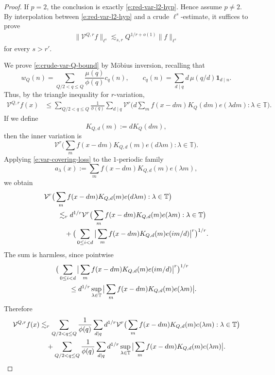 \documentclass[12pt]{amsart}
\numberwithin{equation}{section}
\theoremstyle{definition}
\begin{document}
\begin{proof}
If \(p=2\), the conclusion is exactly \eqref{e:red-var-l2-hyp}.  Hence assume
\(p\neq2\).  By interpolation between \eqref{e:red-var-l2-hyp} and a crude
\(\ell^s\)-estimate, it suffices to prove
\begin{align}\label{e:crude-var-Q-bound}
    \|\mathcal V^{Q,r}f\|_{\ell^s}
    \lesssim_{s,r}
    Q^{1/r+o(1)}\|f\|_{\ell^s}
\end{align}
for every \(s>r'\).

We prove \eqref{e:crude-var-Q-bound} by M\"obius inversion, recalling that
\[
    w_Q(n)
    =
    \sum_{Q/2<q\leq Q}
    \frac{\mu(q)}{\phi(q)}c_q(n),
    \qquad
    c_q(n)
    =
    \sum_{d\mid q} d\,\mu(q/d)\mathbf 1_{d\mid n}.
\]
Thus, by the triangle inequality for \(r\)-variation,
\begin{align}
    \mathcal V^{Q,r}f(x)
    &\leq
    \sum_{Q/2<q\leq Q}
    \frac1{\phi(q)}
    \sum_{d\mid q}
    \mathcal{V}^r\big(
    d\sum_m f(x-dm)K_Q(dm)e(\lambda dm):\lambda\in\mathbb T
    \big).
\end{align}
If we define
\[
    K_{Q,d}(m):=dK_Q(dm),
\]
then the inner variation is
\[
    \mathcal{V}^r\big(
    \sum_m f(x-dm)K_{Q,d}(m)e(d\lambda m):\lambda\in\mathbb T
    \big).
\]
Applying \eqref{e:var-covering-loss} to the \(1\)-periodic family
\[
    a_\lambda(x)
    :=
    \sum_m f(x-dm)K_{Q,d}(m)e(\lambda m),
\]
we obtain
\begin{align}
    &\mathcal{V}^r\big(
    \sum_m f(x-dm)K_{Q,d}(m)e(d\lambda m):\lambda\in\mathbb T
    \big)
    \notag\\
    &\qquad\lesssim_r
    d^{1/r}
    \mathcal{V}^r\big(
    \sum_m f(x-dm)K_{Q,d}(m)e(\lambda m):\lambda\in\mathbb T
    \big)
    \notag\\
    &\qquad\quad+
    \big(
    \sum_{0\leq i<d}
    \big|
    \sum_m f(x-dm)K_{Q,d}(m)e(im/d)
    \big|^r
    \big)^{1/r}.
\end{align}
The sum is harmless, since pointwise
\begin{align}
    &\big(
    \sum_{0\leq i<d}
    \big|
    \sum_m f(x-dm)K_{Q,d}(m)e(im/d)
    \big|^r
    \big)^{1/r}
    \notag\\
    &\qquad\leq
    d^{1/r}
    \sup_{\lambda\in\mathbb T}
    \big|
    \sum_m f(x-dm)K_{Q,d}(m)e(\lambda m)
    \big|.
\end{align}
Therefore
\begin{align}\label{e:mobius-var-pointwise}
    \mathcal V^{Q,r}f(x)
    &\lesssim_r
    \sum_{Q/2<q\leq Q}
    \frac1{\phi(q)}
    \sum_{d\mid q}d^{1/r}
    \mathcal{V}^r\big(
    \sum_m f(x-dm)K_{Q,d}(m)e(\lambda m):\lambda\in\mathbb T
    \big)
    \notag\\
    &\quad+
    \sum_{Q/2<q\leq Q}
    \frac1{\phi(q)}
    \sum_{d\mid q}d^{1/r}
    \sup_{\lambda\in\mathbb T}
    \big|
    \sum_m f(x-dm)K_{Q,d}(m)e(\lambda m)
    \big|.
\end{align}


\end{proof}
\end{document}
